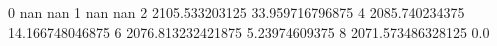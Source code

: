 0 nan nan
1 nan nan
2 2105.533203125 33.959716796875
4 2085.740234375 14.166748046875
6 2076.813232421875 5.23974609375
8 2071.573486328125 0.0
